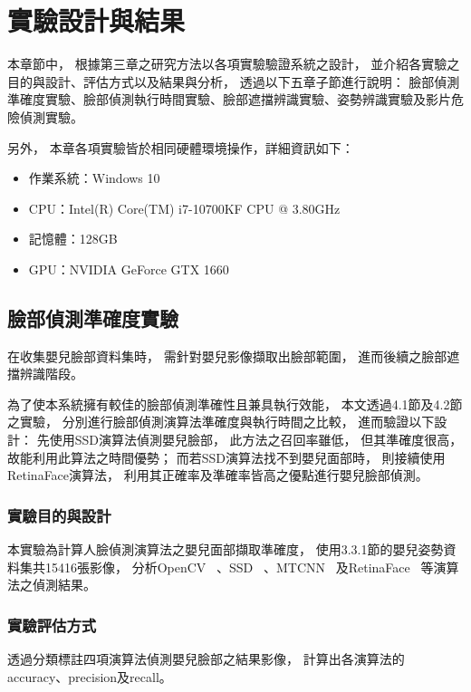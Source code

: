 \documentclass[class=NCU_thesis, crop=false]{standalone}
\begin{document}
\chapter{實驗設計與結果}
本章節中，
根據第三章之研究方法以各項實驗驗證系統之設計，
並介紹各實驗之目的與設計、評估方式以及結果與分析，
透過以下五章子節進行說明：
臉部偵測準確度實驗、臉部偵測執行時間實驗、臉部遮擋辨識實驗、姿勢辨識實驗及影片危險偵測實驗。

另外，
本章各項實驗皆於相同硬體環境操作，詳細資訊如下：
\begin{itemize}
    \item 作業系統：Windows 10
    \item CPU：Intel(R) Core(TM) i7-10700KF CPU @ 3.80GHz
    \item 記憶體：128GB
    \item GPU：NVIDIA GeForce GTX 1660
\end{itemize}

\section{臉部偵測準確度實驗}
在收集嬰兒臉部資料集時，
需針對嬰兒影像擷取出臉部範圍，
進而後續之臉部遮擋辨識階段。

為了使本系統擁有較佳的臉部偵測準確性且兼具執行效能，
本文透過4.1節及4.2節之實驗，
分別進行臉部偵測演算法準確度與執行時間之比較，
進而驗證以下設計：
先使用SSD演算法偵測嬰兒臉部，
此方法之召回率雖低，
但其準確度很高，
故能利用此算法之時間優勢；
而若SSD演算法找不到嬰兒面部時，
則接續使用RetinaFace演算法，
利用其正確率及準確率皆高之優點進行嬰兒臉部偵測。

\subsection{實驗目的與設計}
本實驗為計算人臉偵測演算法之嬰兒面部擷取準確度，
使用3.3.1節的嬰兒姿勢資料集共15416張影像，
分析OpenCV~\cite{goyal_face_2017}
、SSD~\cite{ye_face_2021}
、MTCNN~\cite{zhang_joint_2016}
及RetinaFace~\cite{deng_retinaface_2020}
等演算法之偵測結果。

\subsection{實驗評估方式}
透過分類標註四項演算法偵測嬰兒臉部之結果影像，
計算出各演算法的accuracy、precision及recall。
\end{document}
